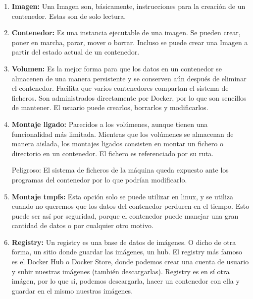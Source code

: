 \documentclass[]{article}
\begin{document}
\begin{enumerate}
\renewcommand{\labelenumi}{$ \bullet $}

\item {\bf Imagen:} Una Imagen son, básicamente, instrucciones para la creación de un contenedor.
Estas son de solo lectura.

\item {\bf Contenedor:} Es una instancia ejecutable de una imagen. Se pueden crear, poner en marcha, parar, mover o borrar. Incluso se puede crear una Imagen a partir del estado actual de un contenedor.

\item {\bf Volumen:} Es la mejor forma para que los datos en un contenedor se almacenen de una manera persistente y se conserven aún después de eliminar el contenedor. Facilita que varios contenedores compartan el sistema de ficheros. Son administrados directamente por Docker, por lo que son sencillos de mantener. El usuario puede crearlos, borrarlos y modificarlos.

\item {\bf Montaje ligado:} Parecidos a los volúmenes, aunque tienen una funcionalidad más limitada. Mientras que los volúmenes se almacenan de manera aislada, los montajes ligados consisten en montar un fichero o directorio en un contenedor. El fichero es referenciado por su ruta.

\hspace{1cm} Peligroso: El sistema de ficheros de la máquina queda expuesto ante los programas del contenedor por lo que podrían modificarlo.

\item {\bf Montaje tmpfs:} Esta opción solo se puede utilizar en linux, y se utiliza cuando no queremos que los datos del contenedor perduren en el tiempo. Esto puede ser así por seguridad, porque el contenedor puede manejar una gran cantidad de datos o por cualquier otro motivo.


 \item {\bf Registry:} Un registry es una base de datos de imágenes. O dicho de otra forma, un sitio donde guardar las imágenes, un hub.	El registry más famoso es el Docker Hub o Docker Store, donde podemos crear una cuenta de usuario y subir nuestras imágenes (también descargarlas).
 Registry es en sí otra imágen, por lo que sí, podemos descargarla, hacer un contenedor con ella y guardar en el mismo nuestras imágenes.
			
\end{enumerate}
\end{document}
